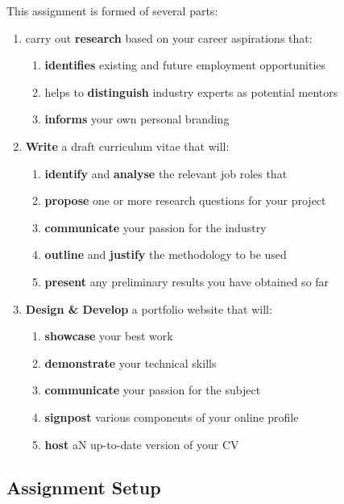\documentclass{../../fal_assignment}
\begin{document}
This assignment is formed of several parts:
\begin{enumerate}[label=(\Alph*)]
	\item carry out \textbf{research} based on your career aspirations that:
		\begin{enumerate}[label=(\roman*)]
			\item \textbf{identifies} existing and future employment opportunities  
			\item helps to \textbf{distinguish} industry experts as potential mentors
			\item \textbf{informs} your own personal branding
		\end{enumerate}
	
	\item  \textbf{Write} a draft curriculum vitae that will:
		\begin{enumerate}[label=(\roman*)]
			\item \textbf{identify} and \textbf{analyse} the relevant job roles that 
			\item \textbf{propose} one or more research questions for your project
			\item \textbf{communicate} your passion for the industry
			\item \textbf{outline} and \textbf{justify} the methodology to be used
			\item \textbf{present} any preliminary results you have obtained so far
		\end{enumerate}
		
	\item \textbf{Design \& Develop} a portfolio website that will:
		\begin{enumerate}[label=(\roman*)]
			\item \textbf{showcase} your best work
			\item \textbf{demonstrate} your technical skills
			\item \textbf{communicate} your passion for the subject
			\item \textbf{signpost} various components of your online profile
			\item \textbf{host} aN up-to-date version of your CV
		\end{enumerate}
	\end{enumerate}

\subsection*{Assignment Setup}
\end{document}
